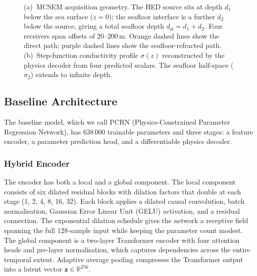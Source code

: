 \documentclass[journal]{IEEEtran}
\begin{document}
\begin{figure}[t]
  \caption{(a)~MCSEM acquisition geometry. The HED source sits at
  depth $d_1$ below the sea surface ($z = 0$); the seafloor interface
  is a further $d_2$ below the source, giving a total seafloor depth
  $d_\mathrm{sf} = d_1 + d_2$. Four receivers span offsets of
  20--200\,m. Orange dashed lines show the direct path; purple dashed
  lines show the seafloor-refracted path. (b)~Step-function
  conductivity profile $\sigma(z)$ reconstructed by the physics
  decoder from four predicted scalars. The seafloor half-space
  ($\sigma_2$) extends to infinite depth.}
  \label{fig:earthmodel}
\end{figure}


\subsection{Baseline Architecture}
\label{sec:baseline}

The baseline model, which we call PCRN (Physics-Constrained Parameter
Regression Network), has 638\,000 trainable parameters and three
stages: a feature encoder, a parameter prediction head, and a
differentiable physics decoder.

\subsubsection{Hybrid Encoder}

The encoder has both a local and a global component. The local
component consists of six dilated residual blocks with dilation
factors that double at each stage (1, 2, 4, 8, 16, 32). Each block
applies a dilated causal convolution, batch normalisation, Gaussian
Error Linear Unit (GELU) activation, and a residual connection. The exponential dilation
schedule gives the network a receptive field spanning the full
128-sample input while keeping the parameter count modest. The global
component is a two-layer Transformer encoder with four attention
heads and pre-layer normalisation, which captures dependencies across
the entire temporal extent. Adaptive average pooling compresses the
Transformer output into a latent vector
$\mathbf{z} \in \mathbb{R}^{256}$.
\end{document}
